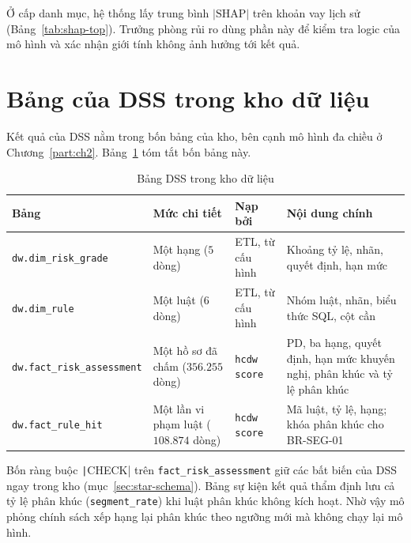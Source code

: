 \medskip

Ở cấp danh mục, hệ thống lấy trung bình $|\text{SHAP}|$ trên khoản vay lịch sử (Bảng~\ref{tab:shap-top}). Trưởng phòng rủi ro dùng phần này để kiểm tra logic của mô hình và xác nhận giới tính không ảnh hưởng tới kết quả.

\section{Bảng của DSS trong kho dữ liệu}
\label{sec:dss-tables}

Kết quả của DSS nằm trong bốn bảng của kho, bên cạnh mô hình đa chiều ở Chương~\ref{part:ch2}. Bảng~\ref{tab:dss-tables} tóm tắt bốn bảng này.

\begin{table}[H]
	\centering
	\caption{Bảng DSS trong kho dữ liệu}
	\label{tab:dss-tables}
	\footnotesize
	\begin{tabular}{p{} p{} p{} p{}}
		\toprule
		\textbf{Bảng}                      & \textbf{Mức chi tiết}                 & \textbf{Nạp bởi}    & \textbf{Nội dung chính}                                                    \\
		\midrule
		\texttt{dw.dim\_risk\_grade}       & Một hạng ($5$ dòng)                   & ETL, từ cấu hình    & Khoảng tỷ lệ, nhãn, quyết định, hạn mức                                    \\
		\texttt{dw.dim\_rule}              & Một luật ($6$ dòng)                   & ETL, từ cấu hình    & Nhóm luật, nhãn, biểu thức SQL, cột cần                                    \\
		\texttt{dw.fact\_risk\_assessment} & Một hồ sơ đã chấm ($356.255$ dòng)    & \texttt{hcdw score} & PD, ba hạng, quyết định, hạn mức khuyến nghị, phân khúc và tỷ lệ phân khúc \\
		\texttt{dw.fact\_rule\_hit}        & Một lần vi phạm luật ($108.874$ dòng) & \texttt{hcdw score} & Mã luật, tỷ lệ, hạng; khóa phân khúc cho BR-SEG-01                         \\
		\bottomrule
	\end{tabular}
\end{table}

Bốn ràng buộc \texttt|CHECK| trên \texttt{fact\_risk\_assessment} giữ các bất biến của DSS ngay trong kho (mục~\ref{sec:star-schema}). Bảng sự kiện kết quả thẩm định lưu cả tỷ lệ phân khúc (\texttt{segment\_rate}) khi luật phân khúc không kích hoạt. Nhờ vậy mô phỏng chính sách xếp hạng lại phân khúc theo ngưỡng mới mà không chạy lại mô hình.

